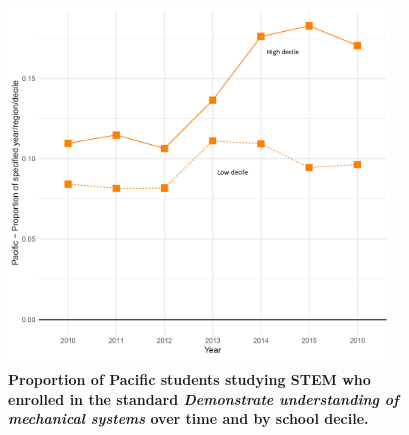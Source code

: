 \begin{figure}[h]
    \centering
    \includegraphics[width=0.9\textwidth]{C2 - Student Pathways/L3NCEA_PacificDecile_Mechanics.png}
    \caption{\textbf{Proportion of Pacific students studying STEM who enrolled in the standard \textit{Demonstrate understanding of mechanical systems} over time and by school decile. }
    }
    
    \label{fig:PacificDecileMechanics}
\end{figure}
